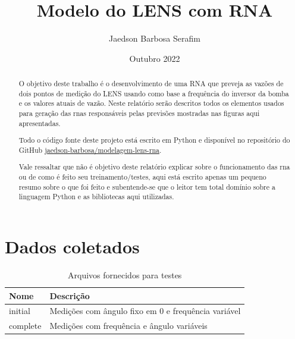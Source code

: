 \documentclass[12pt]{article}
\title{Modelo do LENS com RNA}
\author{Jaedson Barbosa Serafim}
\date{Outubro 2022}
\begin{document}
\maketitle

\begin{abstract}

O objetivo deste trabalho é o desenvolvimento de uma RNA que preveja as vazões de dois pontos de medição do LENS usando como base a frequência do inversor da bomba e os valores atuais de vazão.
Neste relatório serão descritos todos os elementos usados para geração das \acrshort{rna}s responsáveis pelas previsões mostradas nas figuras aqui apresentadas.

Todo o código fonte deste projeto está escrito em Python e disponível no repositório do GitHub 
\href{https://github.com/jaedson-barbosa/modelagem-lens-rna}{jaedson-barbosa/modelagem-lens-rna}.

Vale ressaltar que não é objetivo deste relatório explicar sobre o funcionamento das \acrlong{rna} ou de como é feito seu treinamento/testes, aqui está escrito apenas um pequeno resumo sobre o que foi feito e subentende-se que o leitor tem total domínio sobre a linguagem Python e as bibliotecas aqui utilizadas. 

\end{abstract}

\tableofcontents

\section{Dados coletados}

\begin{table}
\caption{Arquivos fornecidos para testes}
\centering
\begin{tabular}{|l|l|} 
\hline
Nome & Descrição \\ 
\hline
initial & Medições com ângulo fixo em 0 e frequência variável \\ 
\hline
complete & Medições com frequência e ângulo variáveis \\
\hline
\end{tabular}
\label{tab:arquivos_testes}
\end{table}
\end{document}
